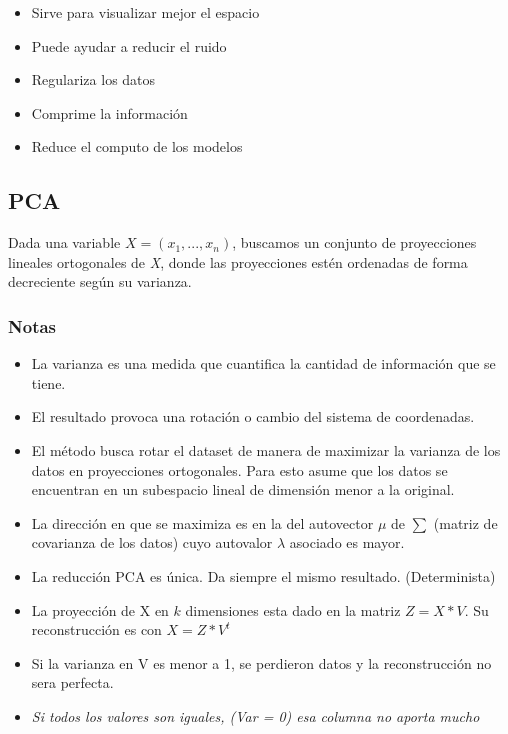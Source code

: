 \documentclass[titlepage,a4paper]{article}
\begin{document}
\begin{itemize}
    \item Sirve para visualizar mejor el espacio
    \item Puede ayudar a reducir el ruido
    \item Regulariza los datos
    \item Comprime la información
    \item Reduce el computo de los modelos
\end{itemize}

\subsection{PCA}

Dada una variable \begin{math} X = (x_1,...,x_n) \end{math}, buscamos un conjunto de proyecciones lineales ortogonales de \textit{X}, donde las proyecciones estén ordenadas de forma decreciente según su varianza.

\subsubsection*{Notas}
\begin{itemize}

\item La varianza es una medida que cuantifica la cantidad de información que se tiene.

\item El resultado provoca una rotación o cambio del sistema de coordenadas.

\item El método busca rotar el dataset de manera de maximizar la varianza de los datos en proyecciones ortogonales. Para esto asume que los datos se encuentran en un subespacio lineal de dimensión menor a la original.

\item La dirección en que se maximiza es en la del autovector $\mu$ de $\sum$ (matriz de covarianza de los datos) cuyo autovalor $\lambda$ asociado es mayor.

\item La reducción PCA es única. Da siempre el mismo resultado. (Determinista)

\item La proyección de X en $k$ dimensiones esta dado en la matriz $Z = X * V$. Su reconstrucción es con $X = Z * V^{t}$

\item Si la varianza en V es menor a 1, se perdieron datos y la reconstrucción no sera perfecta.

\item \textit{Si todos los valores son iguales, (Var = 0) esa columna no aporta mucho}

\end{itemize}
\end{document}
